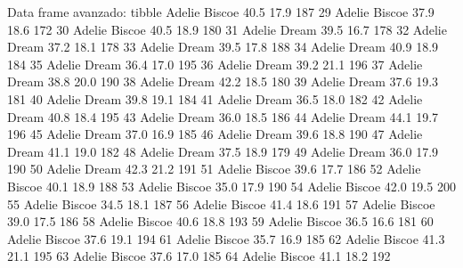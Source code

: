 \documentclass[
  ignorenonframetext,
  aspectratio=169]{beamer}
\let\oldverbatim\verbatim
\let\endoldverbatim\endverbatim
\renewenvironment{verbatim}{\tiny\oldverbatim}{\endoldverbatim}
\begin{document}
\begin{frame}[fragile]{Data frame avanzado: tibble}
\begin{verbatim}
28     Adelie    Biscoe           40.5          17.9               187
29     Adelie    Biscoe           37.9          18.6               172
30     Adelie    Biscoe           40.5          18.9               180
31     Adelie     Dream           39.5          16.7               178
32     Adelie     Dream           37.2          18.1               178
33     Adelie     Dream           39.5          17.8               188
34     Adelie     Dream           40.9          18.9               184
35     Adelie     Dream           36.4          17.0               195
36     Adelie     Dream           39.2          21.1               196
37     Adelie     Dream           38.8          20.0               190
38     Adelie     Dream           42.2          18.5               180
39     Adelie     Dream           37.6          19.3               181
40     Adelie     Dream           39.8          19.1               184
41     Adelie     Dream           36.5          18.0               182
42     Adelie     Dream           40.8          18.4               195
43     Adelie     Dream           36.0          18.5               186
44     Adelie     Dream           44.1          19.7               196
45     Adelie     Dream           37.0          16.9               185
46     Adelie     Dream           39.6          18.8               190
47     Adelie     Dream           41.1          19.0               182
48     Adelie     Dream           37.5          18.9               179
49     Adelie     Dream           36.0          17.9               190
50     Adelie     Dream           42.3          21.2               191
51     Adelie    Biscoe           39.6          17.7               186
52     Adelie    Biscoe           40.1          18.9               188
53     Adelie    Biscoe           35.0          17.9               190
54     Adelie    Biscoe           42.0          19.5               200
55     Adelie    Biscoe           34.5          18.1               187
56     Adelie    Biscoe           41.4          18.6               191
57     Adelie    Biscoe           39.0          17.5               186
58     Adelie    Biscoe           40.6          18.8               193
59     Adelie    Biscoe           36.5          16.6               181
60     Adelie    Biscoe           37.6          19.1               194
61     Adelie    Biscoe           35.7          16.9               185
62     Adelie    Biscoe           41.3          21.1               195
63     Adelie    Biscoe           37.6          17.0               185
64     Adelie    Biscoe           41.1          18.2               192

\end{verbatim}
\end{frame}
\end{document}

